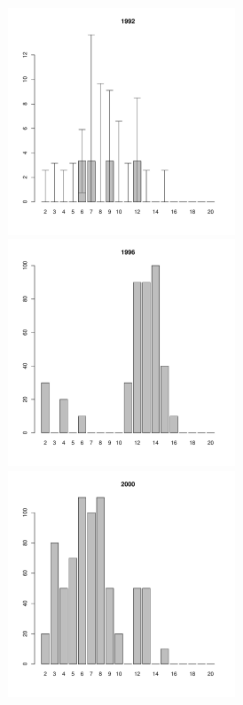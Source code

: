 	\begin{figure}[hp]

	\begin{minipage}[b]{.3\linewidth}
	\begin{center}
	\includegraphics[width=60mm]{../White_Sea/Luvenga_Goreliy/low2_1992_.pdf}	
	\end{center}
	\end{minipage}
	\hfil %
	\begin{minipage}[b]{.3\linewidth}
	\begin{center}
	\includegraphics[width=60mm]{../White_Sea/Luvenga_Goreliy/low2_1996_.pdf}
	\end{center}
	\end{minipage}
	\hfil %
	\begin{minipage}[b]{.3\linewidth}
	\begin{center}
\includegraphics[width=60mm]{../White_Sea/Luvenga_Goreliy/low2_2000_.pdf}

\end{center}
\end{minipage}
\end{figure}
